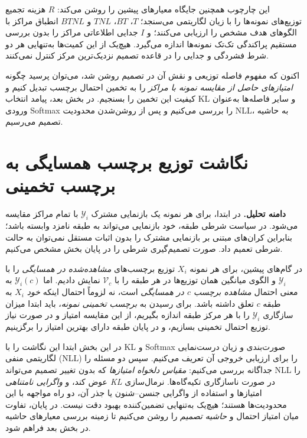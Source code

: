 این چارچوب همچنین جایگاه معیارهای پیشین را روشن می‌کند: $R$ هزینه تجمیع توزیع‌های نمونه‌ها را با زیان لگاریتمی می‌سنجد؛ $T$، $BT$، $TNL$ و $BTNL$ انطباق مراکز با الگوهای هدف مشخص را ارزیابی می‌کنند؛ و $I$ جدایی اطلاعاتی مراکز را بدون بررسی مستقیم پراکندگی تک‌تک نمونه‌ها اندازه می‌گیرد. هیچ‌یک از این کمیت‌ها به‌تنهایی هر دو شرط فشردگی و جدایی را در قاعده تصمیم نزدیک‌ترین مرکز کنترل نمی‌کنند.

اکنون که مفهوم فاصله توزیعی و نقش آن در تصمیم روشن شد، می‌توان پرسید چگونه \emph{امتیازهای حاصل از مقایسه نمونه با مراکز} را به تخمین احتمال برچسب تبدیل کنیم و کیفیت این تخمین را بسنجیم. در بخش بعد، پیامد انتخاب KL و سایر فاصله‌ها به‌عنوان ورودی Softmax را بررسی می‌کنیم و پس از روشن‌شدن محدودیت NLL، به حاشیه تصمیم می‌رسیم.

\section{نگاشت توزیع برچسب همسایگی به برچسب تخمینی}
\label{sec:ch3-NLL}

\noindent\textbf{دامنه تحلیل.}
در ابتدا، برای هر نمونه یک بازنمایی مشترک
$\mathscr Y_i$ با تمام مراکز مقایسه می‌شود.
در سیاست شرطی طبقه، خود بازنمایی می‌تواند
به طبقه نامزد وابسته باشد؛ بنابراین کران‌های
مبتنی بر بازنمایی مشترک را بدون اثبات مستقل
نمی‌توان به حالت شرطی تعمیم داد. صورت
تصمیم‌گیری شرطی را در پایان بخش مشخص می‌کنیم.


در گام‌های پیشین، برای هر نمونه $X_i$ توزیع
برچسب‌های \emph{مشاهده‌شده در همسایگی} را با
$\mathscr Y_i$ و الگوی میانگین همان توزیع‌ها
در هر طبقه را با $\mathcal V_c$ نمایش دادیم.
اما $\mathscr Y_i(c)$ به معنی احتمال
\emph{مشاهده برچسب $c$ در همسایگی}
است، نه لزوماً احتمال اینکه \emph{خود $X_i$}
به طبقه $c$ تعلق داشته باشد.
برای رسیدن به \emph{برچسب تخمینی نمونه}،
باید ابتدا میزان سازگاری $\mathscr Y_i$ را
با هر مرکز طبقه اندازه بگیریم، از این
مقایسه امتیاز و در صورت نیاز توزیع
احتمال تخمینی بسازیم، و در پایان
طبقه دارای بهترین امتیاز را برگزینیم.

در این بخش ابتدا این نگاشت را با
KL و Softmax صورت‌بندی و زیان
درست‌نمایی لگاریتمی منفی (NLL)
را برای ارزیابی خروجی آن تعریف می‌کنیم.
سپس دو مسئله را جداگانه بررسی می‌کنیم:
\emph{مقیاس دلخواه امتیازها} که بدون
تغییر تصمیم می‌تواند NLL را عوض کند،
و \emph{واگرایی نامتناهی KL} در
صورت ناسازگاری تکیه‌گاه‌ها.
نرمال‌سازی امتیازها و استفاده از
واگرایی جنسن--شنون یا جذر آن،
دو راه مواجهه با این محدودیت‌ها هستند؛
هیچ‌یک به‌تنهایی تضمین‌کننده
بهبود دقت نیست. در پایان، تفاوت
میان امتیاز احتمال و \emph{حاشیه تصمیم}
را روشن می‌کنیم تا زمینه بررسی
معیارهای حاشیه در بخش بعد فراهم شود.

